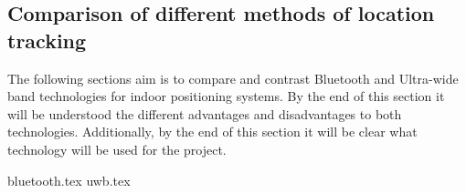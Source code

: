 \subsection{Comparison of different methods of location tracking}
The following sections aim is to compare and contrast Bluetooth and Ultra-wide band technologies for indoor positioning systems. By the end of this section it will be understood the different advantages and disadvantages to both technologies. Additionally, by the end of this section it will be clear what technology will be used for the project.

{bluetooth.tex}
{uwb.tex}
